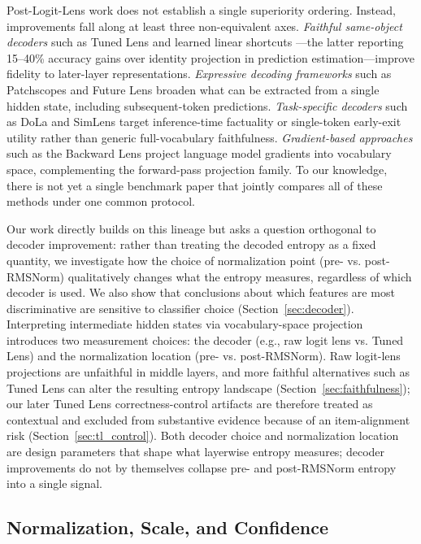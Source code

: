 \documentclass{ieeeaccess}
\begin{document}
Post-Logit-Lens work does not establish a single superiority ordering. Instead, improvements fall along at least three non-equivalent axes. \textit{Faithful same-object decoders} such as Tuned Lens \cite{belrose2023tuned} and learned linear shortcuts \cite{yomdin2024jump}---the latter reporting 15--40\% accuracy gains over identity projection in prediction estimation---improve fidelity to later-layer representations. \textit{Expressive decoding frameworks} such as Patchscopes \cite{ghandeharioun2024patchscopes} and Future Lens \cite{pal2023futurelens} broaden what can be extracted from a single hidden state, including subsequent-token predictions. \textit{Task-specific decoders} such as DoLa \cite{chuang2024dola} and SimLens \cite{ma2025simlens} target inference-time factuality or single-token early-exit utility rather than generic full-vocabulary faithfulness. \textit{Gradient-based approaches} such as the Backward Lens \cite{katz2024backward} project language model gradients into vocabulary space, complementing the forward-pass projection family. To our knowledge, there is not yet a single benchmark paper that jointly compares all of these methods under one common protocol.

Our work directly builds on this lineage but asks a question orthogonal to decoder improvement: rather than treating the decoded entropy as a fixed quantity, we investigate how the choice of normalization point (pre- vs. post-RMSNorm) qualitatively changes what the entropy measures, regardless of which decoder is used. We also show that conclusions about which features are most discriminative are sensitive to classifier choice (Section~\ref{sec:decoder}). Interpreting intermediate hidden states via vocabulary-space projection introduces two measurement choices: the decoder (e.g., raw logit lens vs. Tuned Lens) and the normalization location (pre- vs. post-RMSNorm). Raw logit-lens projections are unfaithful in middle layers, and more faithful alternatives such as Tuned Lens can alter the resulting entropy landscape (Section~\ref{sec:faithfulness}); our later Tuned Lens correctness-control artifacts are therefore treated as contextual and excluded from substantive evidence because of an item-alignment risk (Section~\ref{sec:tl_control}). Both decoder choice and normalization location are design parameters that shape what layerwise entropy measures; decoder improvements do not by themselves collapse pre- and post-RMSNorm entropy into a single signal.

\subsection{Normalization, Scale, and Confidence}
\end{document}

